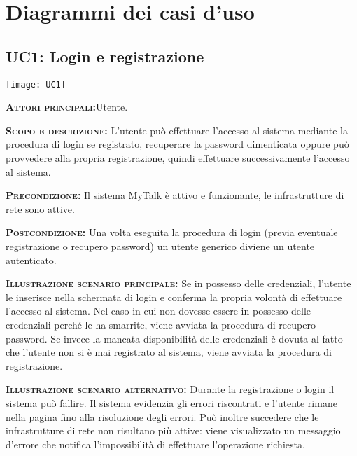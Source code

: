 \newpage\section{Diagrammi dei casi d'uso}

\subsection{UC1: Login e registrazione}
\begin{center}
\texttt{[image: UC1]}
\end{center}
\begin{description}
\item{\scshape\bfseries Attori principali:}Utente.
\item{\scshape\bfseries Scopo e descrizione:} L'utente può effettuare l'accesso al sistema mediante la procedura di login se registrato, recuperare la password dimenticata oppure può provvedere alla propria registrazione, quindi effettuare successivamente l'accesso al sistema.
\item{\scshape\bfseries Precondizione:} Il sistema MyTalk è attivo e funzionante, le infrastrutture di rete sono attive.
\item{\scshape\bfseries Postcondizione:} Una volta eseguita la procedura di login (previa eventuale registrazione o recupero password) un utente generico diviene un utente autenticato.
\item{\scshape\bfseries Illustrazione scenario principale:} Se in possesso delle credenziali, l'utente le inserisce nella schermata di login e conferma la propria volontà di effettuare l'accesso al sistema. Nel caso in cui non dovesse essere in possesso delle credenziali perché le ha smarrite, viene avviata la procedura di recupero password. Se invece la mancata disponibilità delle credenziali è dovuta al fatto che l'utente non si è mai registrato al sistema, viene avviata la procedura di registrazione.
\item{\scshape\bfseries Illustrazione scenario alternativo:} Durante la registrazione o login il sistema può fallire. Il sistema evidenzia gli errori riscontrati e l'utente rimane nella pagina fino alla risoluzione degli errori. Può inoltre succedere che le infrastrutture di rete non risultano più attive: viene visualizzato un messaggio d'errore che notifica l'impossibilità di effettuare l'operazione richiesta.
\end{description}

